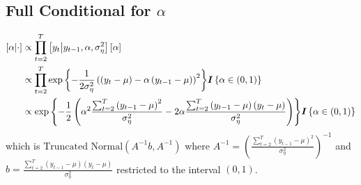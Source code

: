 \documentclass[fleqn]{article}
\def\bm#1{\mbox{\boldmath $#1$}}
\begin{document}
\subsection{Full Conditional for $\alpha$}
%
\begin{align*}
%
\left[ \alpha \middle| \cdot \right] & \propto \prod_{t = 2}^T \left[ y_t \middle| y_{t - 1}, \alpha, \sigma^2_\eta \right] \left[ \alpha \right]\\
%
& \propto \prod_{t = 2}^T \exp{ \left\{ - \frac{1} {2 \sigma^2_\eta} \left( \left( y_t - \mu \right) - \alpha \left( y_{t - 1} - \mu \right) \right)^2 \right\} } \bm{I}\left\{ \alpha \in \left( 0, 1 \right) \right\} \\
%
& \propto \exp{ \left\{ - \frac{1} {2} \left( \alpha^2 \frac{ \sum_{t = 2}^T \left( y_{t - 1} - \mu \right)^2} {\sigma^2_\eta} - 2 \alpha \frac{ \sum_{t = 2}^T \left( y_{t - 1} - \mu \right) \left( y_t - \mu \right)} {\sigma^2_\eta} \right) \right\} } \bm{I}\left\{ \alpha \in \left( 0, 1 \right) \right\} \\
%
\end{align*}
%
which is $\mbox{Truncated Normal}\left( A^{ - 1} b, A^{ - 1} \right)$ where $A^{ - 1} =  \left( \frac{ \sum_{t = 2}^T \left( y_{t - 1} - \mu \right)^2} {\sigma^2_\eta} \right)^{  -1}$ and $b = \frac{ \sum_{t = 2}^T \left( y_{t - 1} - \mu \right) \left( y_t - \mu \right)} {\sigma^2_\eta}$ restricted to the interval $\left(0, 1 \right)$.
\end{document}
